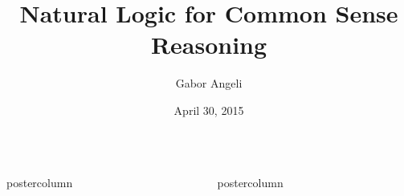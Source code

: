 \documentclass[final]{beamer} %
\title[NaturalLI]{Natural Logic for Common Sense Reasoning}
\author[Gabor Angeli]{Gabor Angeli}
\institute[Stanford]{Stanford Natural Language Processing}
\date{April 30, 2015}
\newlength{\columnheight}
\begin{document}
\begin{frame}{} 
\begin{columns}

\begin{column}{.49\textwidth}
  \begin{beamercolorbox}[center,wd=\textwidth]{postercolumn}
    \begin{minipage}[T]{.95\textwidth}  %
      \parbox[t][\columnheight]{\textwidth}{%
        
        
      }
    \end{minipage}
  \end{beamercolorbox}
\end{column}

\begin{column}{.49\textwidth}
  \begin{beamercolorbox}[center,wd=\textwidth]{postercolumn}
    \begin{minipage}[T]{.95\textwidth}  %
      \parbox[t][\columnheight]{\textwidth}{%
        
        
      }
    \end{minipage}
  \end{beamercolorbox}
\end{column}

\end{columns}
\end{frame}
\end{document}
